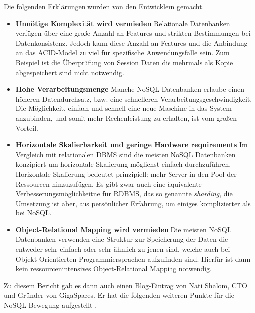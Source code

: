 Die folgenden Erklärungen wurden von den Entwicklern gemacht.
\begin{itemize}
	\item \textbf{Unnötige Komplexität wird vermieden}\newline
	 Relationale Datenbanken verfügen über eine große Anzahl an Features und strikten Bestimmungen bei Datenkonsistenz. Jedoch kann diese Anzahl an Features und die Anbindung an das ACID-Model zu viel für spezifische Anwendungsfälle sein. Zum Beispiel ist die Überprüfung von Session Daten die mehrmals als Kopie abgespeichert sind nicht notwendig.

	\item \textbf{Hohe Verarbeitungsmenge}\newline
	 Manche NoSQL Datenbanken erlaube einen höheren Datendurchsatz, bzw. eine schnelleren Verarbeitungsgeschwindigkeit. Die Möglichkeit, einfach und schnell eine neue Maschine in das System anzubinden, und somit mehr Rechenleistung zu erhalten, ist vom großen Vorteil.

	\item \textbf{Horizontale Skalierbarkeit und geringe Hardware requirements}\newline
	 Im Vergleich mit relationalen DBMS sind die meisten NoSQL Datenbanken konzipiert um horizontale Skalierung möglichst einfach durchzuführen. Horizontale Skalierung bedeutet prinzipiell: mehr Server in den Pool der Ressourcen hinzuzufügen. Es gibt zwar auch eine äquivalente Verbesserungsmöglichkeitne für RDBMS, das so genannte \textit{sharding}, die Umsetzung ist aber, aus persönlicher Erfahrung, um einiges komplizierter als bei NoSQL.

	\item \textbf{Object-Relational Mapping wird vermieden}\newline
	 Die meisten NoSQL Datenbanken verwenden eine Struktur zur Speicherung der Daten die entweder sehr einfach oder sehr ähnlich zu jenen sind, welche auch bei Objekt-Orientierten-Programmiersprachen aufzufinden sind. Hierfür ist dann kein ressourcenintensives Object-Relational Mapping notwendig.
\end{itemize}

Zu diesem Bericht gab es dann auch einen Blog-Eintrag von Nati Shalom, CTO und Gründer von GigaSpaces. Er hat die folgenden weiteren Punkte für die NoSQL-Bewegung aufgestellt \cite{MELD.CH2-noSQL.natiShalomlol}.

